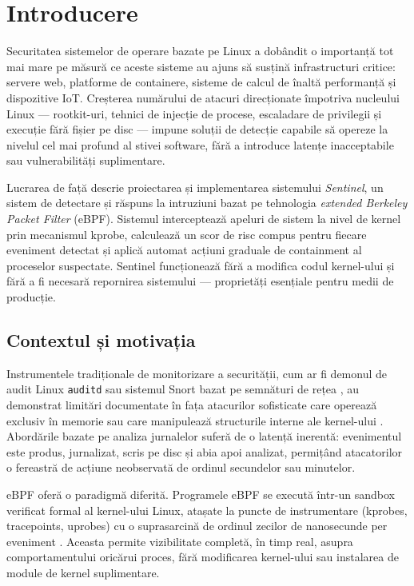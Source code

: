 \chapter{Introducere}
\label{intro}

\par Securitatea sistemelor de operare bazate pe Linux a dobândit o importanță tot mai mare pe măsură ce aceste sisteme au ajuns să susțină infrastructuri critice: servere web, platforme de containere, sisteme de calcul de înaltă performanță și dispozitive IoT. Creșterea numărului de atacuri direcționate împotriva nucleului Linux — rootkit-uri, tehnici de injecție de procese, escaladare de privilegii și execuție fără fișier pe disc — impune soluții de detecție capabile să opereze la nivelul cel mai profund al stivei software, fără a introduce latențe inacceptabile sau vulnerabilități suplimentare.

\par Lucrarea de față descrie proiectarea și implementarea sistemului \textit{Sentinel}, un sistem de detectare și răspuns la intruziuni bazat pe tehnologia \textit{extended Berkeley Packet Filter} (eBPF). Sistemul interceptează apeluri de sistem la nivel de kernel prin mecanismul kprobe, calculează un scor de risc compus pentru fiecare eveniment detectat și aplică automat acțiuni graduale de containment al proceselor suspectate. Sentinel funcționează fără a modifica codul kernel-ului și fără a fi necesară repornirea sistemului — proprietăți esențiale pentru medii de producție.


\section{Contextul și motivația}

\par Instrumentele tradiționale de monitorizare a securității, cum ar fi demonul de audit Linux \texttt{auditd} \cite{LinuxAudit} sau sistemul Snort bazat pe semnături de rețea \cite{Roesch1999}, au demonstrat limitări documentate în fața atacurilor sofisticate care operează exclusiv în memorie sau care manipulează structurile interne ale kernel-ului \cite{Cozzi2018}. Abordările bazate pe analiza jurnalelor suferă de o latență inerentă: evenimentul este produs, jurnalizat, scris pe disc și abia apoi analizat, permițând atacatorilor o fereastră de acțiune neobservată de ordinul secundelor sau minutelor.

\par eBPF oferă o paradigmă diferită. Programele eBPF se execută într-un sandbox verificat formal al kernel-ului Linux, atașate la puncte de instrumentare (kprobes, tracepoints, uprobes) cu o suprasarcină de ordinul zecilor de nanosecunde per eveniment \cite{Gregg2019}. Aceasta permite vizibilitate completă, în timp real, asupra comportamentului oricărui proces, fără modificarea kernel-ului sau instalarea de module de kernel suplimentare.

